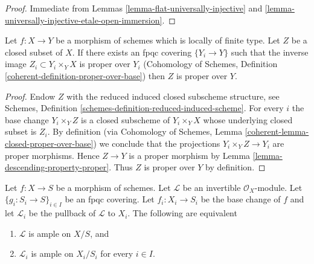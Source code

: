 \begin{proof}
Immediate from Lemmas \ref{lemma-flat-universally-injective} and
\ref{lemma-universally-injective-etale-open-immersion}.
\end{proof}

\begin{lemma}
\label{lemma-descending-property-proper-over-base}
Let $f : X \to Y$ be a morphism of schemes which is locally of finite type.
Let $Z$ be a closed subset of $X$. If there exists an fpqc covering
$\{Y_i \to Y\}$ such that the inverse image $Z_i \subset Y_i \times_Y X$
is proper over $Y_i$
(Cohomology of Schemes, Definition \ref{coherent-definition-proper-over-base})
then $Z$ is proper over $Y$.
\end{lemma}

\begin{proof}
Endow $Z$ with the reduced induced closed subscheme structure, see
Schemes, Definition \ref{schemes-definition-reduced-induced-scheme}.
For every $i$ the base change $Y_i \times_Y Z$ is a closed subscheme
of $Y_i \times_Y X$ whose underlying closed subset is $Z_i$.
By definition (via
Cohomology of Schemes, Lemma \ref{coherent-lemma-closed-proper-over-base})
we conclude that the projections $Y_i \times_Y Z \to Y_i$ are proper
morphisms. Hence $Z \to Y$ is a proper morphism by
Lemma \ref{lemma-descending-property-proper}.
Thus $Z$ is proper over $Y$ by definition.
\end{proof}

\begin{lemma}
\label{lemma-descending-property-ample}
Let $f : X \to S$ be a morphism of schemes.
Let $\mathcal{L}$ be an invertible $\mathcal{O}_X$-module.
Let $\{g_i : S_i \to S\}_{i \in I}$ be an fpqc covering.
Let $f_i : X_i \to S_i$ be the base change of $f$ and let $\mathcal{L}_i$
be the pullback of $\mathcal{L}$ to $X_i$.
The following are equivalent
\begin{enumerate}
\item $\mathcal{L}$ is ample on $X/S$, and
\item $\mathcal{L}_i$ is ample on $X_i/S_i$
for every $i \in I$.
\end{enumerate}
\end{lemma}

